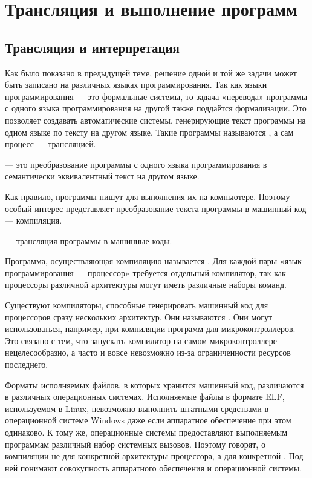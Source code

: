 \chapter{Трансляция и выполнение программ}

\section{Трансляция и интерпретация}

Как было показано в предыдущей теме, решение одной и той же задачи
может быть записано на различных языках программирования. Так как
языки программирования — это формальные системы, то задача «перевода»
программы с одного языка программирования на другой также поддаётся
формализации. Это позволяет создавать автоматические системы,
генерирующие текст программы на одном языке по тексту на другом
языке. Такие программы называются , а
сам процесс — трансляцией.

\begin{defn}
   — это преобразование программы с
  одного языка программирования в семантически эквивалентный текст на
  другом языке.
\end{defn}

Как правило, программы пишут для выполнения их на компьютере. Поэтому
особый интерес представляет преобразование текста программы в машинный
код — компиляция.

\begin{defn}
   — трансляция программы в машинные
  коды.
\end{defn}

Программа, осуществляющая компиляцию называется
.  Для каждой пары «язык
  программирования — процессор» требуется отдельный компилятор, так
как процессоры различной архитектуры могут иметь различные наборы
команд.

Существуют компиляторы, способные генерировать машинный код для
процессоров сразу нескольких архитектур. Они называются
.  Они могут
использоваться, например, при компиляции программ для
микроконтроллеров.  Это связано с тем, что запускать компилятор на
самом микроконтроллере нецелесообразно, а часто и вовсе невозможно
из-за ограниченности ресурсов последнего.

Форматы исполняемых файлов, в которых хранится машинный код,
различаются в различных операционных системах. Исполняемые файлы в
формате ELF, используемом в Linux, невозможно выполнить штатными
средствами в операционной системе Windows даже если аппаратное
обеспечение при этом одинаково. К тому же, операционные системы
предоставляют выполняемым программам различный набор системных
вызовов. Поэтому говорят, о компиляции не для конкретной архитектуры
процессора, а для конкретной
. Под ней понимают совокупность аппаратного обеспечения и
операционной системы.

